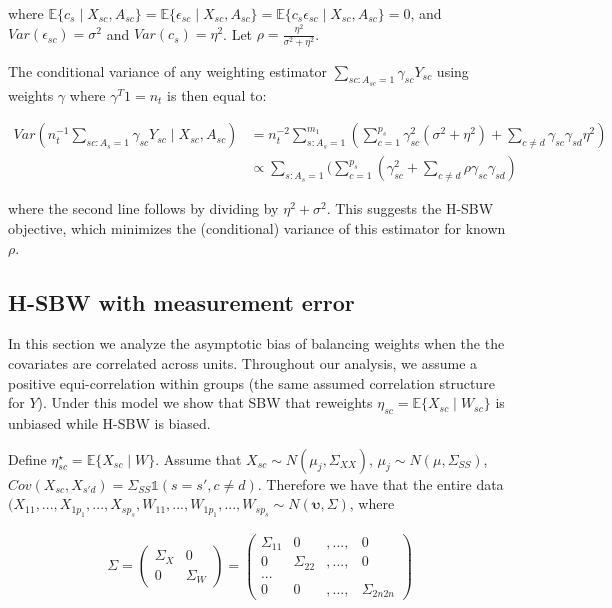 where $\mathbb{E}\{c_s \mid X_{sc}, A_{sc}\} = \mathbb{E}\{\epsilon_{sc} \mid X_{sc}, A_{sc}\} = \mathbb{E}\{c_s\epsilon_{sc} \mid X_{sc}, A_{sc}\} = 0$, and $Var(\epsilon_{sc}) = \sigma^2$ and $Var(c_s) = \eta^2$. Let $\rho = \frac{\eta^2}{\sigma^2 + \eta^2}$.

The conditional variance of any weighting estimator $\sum_{sc: A_{sc} = 1}\gamma_{sc}Y_{sc}$ using weights $\gamma$ where $\gamma^T1 = n_t$ is then equal to:

\begin{align}
    Var(n_t^{-1}\sum_{sc: A_s = 1}\gamma_{sc}Y_{sc} \mid X_{sc}, A_{sc}) &= n_t^{-2}\sum_{s: A_s = 1}^{m_1}(\sum_{c = 1}^{p_s}\gamma_{sc}^2(\sigma^2 + \eta^2) + \sum_{c \ne d}\gamma_{sc}\gamma_{sd}\eta^2) \\
    &\propto \sum_{s: A_s = 1}(\sum_{c = 1}^{p_s}(\gamma_{sc}^2 + \sum_{c \ne d}\rho \gamma_{sc}\gamma_{sd})
\end{align}

where the second line follows by dividing by $\eta^2 + \sigma^2$. This suggests the H-SBW objective, which minimizes the (conditional) variance of this estimator for known $\rho$.

\subsection{H-SBW with measurement error}

In this section we analyze the asymptotic bias of balancing weights when the the covariates are correlated across units. Throughout our analysis, we assume a positive equi-correlation within groups (the same assumed correlation structure for $Y$). Under this model we show that SBW that reweights $\eta_{sc} = \mathbb{E}\{X_{sc} \mid W_{sc}\}$ is unbiased while H-SBW is biased. 

Define $\eta^\star_{sc} = \mathbb{E}\{X_{sc} \mid W\}$. Assume that $X_{sc} \sim N(\mu_j, \Sigma_{XX})$, $\mu_j \sim N(\mu, \Sigma_{SS})$, $Cov(X_{sc}, X_{s'd}) = \Sigma_{SS}\mathds{1}(s = s', c \ne d)$. Therefore we have that the entire data $(X_{11}, ..., X_{1p_1}, ..., X_{sp_s}, W_{11}, ..., W_{1p_1}, ..., W_{sp_s} \sim N(\mathbf{\upsilon}, \Sigma)$, where 

\begin{align*}
\Sigma = \begin{pmatrix}
\Sigma_{X} & 0 \\
0 & \Sigma_{W}
\end{pmatrix} = \begin{pmatrix}
\Sigma_{11} & 0 &, ..., &0 \\
0 & \Sigma_{22} &, ..., &0 \\
... \\
0 & 0 & ,... , & \Sigma_{2n2n}
\end{pmatrix} 
\end{align*}

